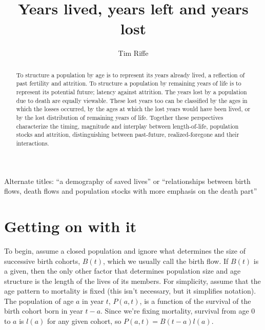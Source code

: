 \documentclass{article}
\begin{document}
\title{Years lived, years left and years lost}
\author{Tim Riffe}
\maketitle


\begin{abstract}
To structure a population by age is to represent its years already
lived, a reflection of past fertility and attrition. To structure a population
by remaining years of life is to represent its potential future; latency against
attrition. The years lost by a population due to death are equally viewable.
These lost years too can be classified by the ages in which the losses occurred, by the ages at which the lost years would have been lived, or by the
lost distribution of remaining years of life. Together these perspectives
characterize the timing, magnitude and interplay between length-of-life,
population stocks and attrition, distinguishing between past-future,
realized-foregone and their interactions.
\end{abstract}

Alternate titles: ``a demography of saved
lives'' or ``relationships between birth flows, death flows and population
stocks with more emphasis on the death part''

\section*{Getting on with it}
To begin, assume a closed population and ignore what determines the size of
successive birth cohorts, $B(t)$, which we usually call the birth flow. If
$B(t)$ is a given, then the only other factor that determines population size
and age structure is the length of the lives of its members. For simplicity,
assume that the age pattern to mortality is fixed (this isn't necessary, but it simplifies notation). The
population of age $a$ in year $t$, $P(a,t)$, is a function of the survival of the birth cohort born in year $t-a$. Since we're
fixing mortality, survival from age 0 to $a$ is $l(a)$ for any given cohort, so
$P(a,t) = B(t-a)l(a)$.
\end{document}
